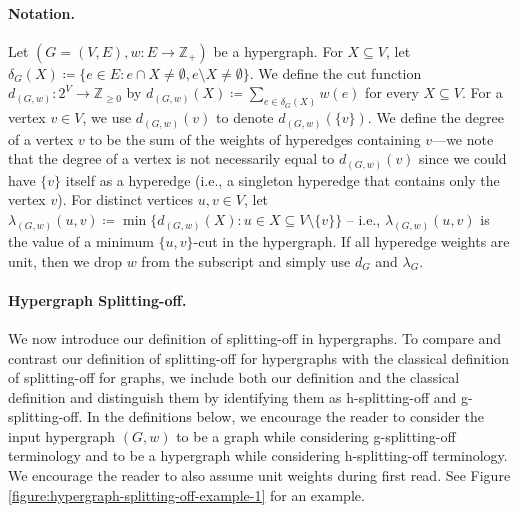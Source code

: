 \documentclass{article}
\newcommand{\knote}[1]{{\color{red}[{\tiny Karthik: \bf #1}]\marginpar{\color{red}*}}}
\providecommand{\Z}{\mathbb{Z}}
\begin{document}
\paragraph{Notation.} Let $(G=(V, E), w: E\rightarrow \Z_+)$ be a hypergraph. 
For $X\subseteq V$, let $\delta_G(X)\coloneqq \{e\in E: e\cap X\neq \emptyset, e\setminus X\neq \emptyset\}$.  
We define the cut function $d_{(G, w)}: 2^V\rightarrow \Z_{\ge 0}$ by $d_{(G, w)}(X) \coloneqq \sum_{e\in \delta_G(X)}w(e)$ for every $X\subseteq V$. 
For a vertex $v\in V$, we use $d_{(G,w)}(v)$ to denote $d_{(G,w)}(\{v\})$. 
We define the degree of a vertex $v$ to be the sum of the weights of hyperedges containing $v$---we note that the degree of a vertex is not necessarily equal to $d_{(G, w)}(v)$ since we could have $\{v\}$ itself as a hyperedge (i.e., a singleton hyperedge that contains only the vertex $v$). 
For distinct vertices $u, v\in V$, let $\lambda_{(G, w)}(u, v)\coloneqq \min\{d_{(G, w)}(X): u\in X\subseteq V\setminus \{v\}\}$ -- i.e., $\lambda_{(G, w)}(u, v)$ is the value of a minimum $\{u, v\}$-cut in the hypergraph. If all hyperedge weights are unit, then we drop $w$ from the subscript and simply use $d_G$ and $\lambda_G$. 

\paragraph{Hypergraph Splitting-off.} 
We now introduce our definition of splitting-off in hypergraphs. 
To compare and contrast our definition of splitting-off for hypergraphs with the classical definition of splitting-off for graphs, we include both our definition and the classical definition and distinguish them by identifying them as h-splitting-off and g-splitting-off. 
In the definitions below, we encourage the reader to consider the input hypergraph $(G, w)$ to be a graph while considering g-splitting-off terminology and to be a hypergraph while considering h-splitting-off terminology. We encourage the reader to also assume unit weights during first read. See Figure \ref{figure:hypergraph-splitting-off-example-1} for an example. 
\end{document}
